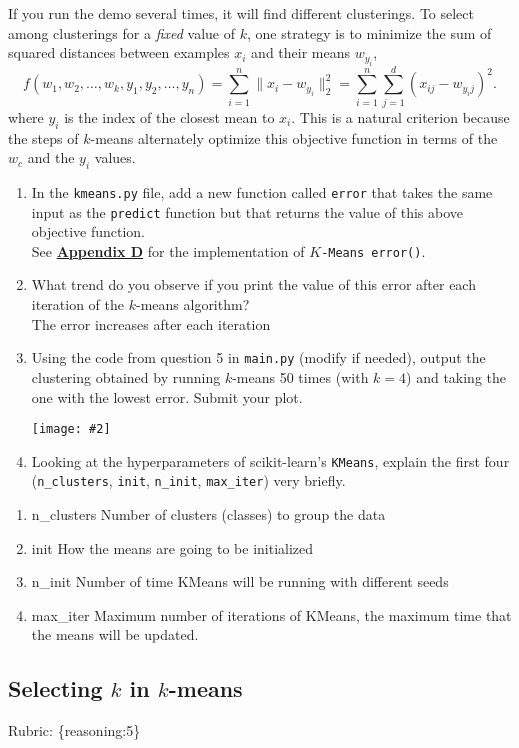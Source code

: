\documentclass{article}
\def\rubric#1{\gre{Rubric: \{#1\}}}{}
\def\blu#1{{\color{blu}#1}}
\def\gre#1{{\color{gre}#1}}
\def\ans#1{{\color{ans}#1}}
\def\norm#1{\|#1\|}
\newcommand{\centerfig}[2]{\begin{center}\texttt{[image: \#2]}\end{center}}
\def\enum#1{\begin{enumerate}#1\end{enumerate}}
\begin{document}
If you run the demo several times, it will find different clusterings. To select among clusterings for a \emph{fixed} value of $k$, one strategy is to minimize the sum of squared distances between examples $x_i$ and their means $w_{y_i}$,
\[
f(w_1,w_2,\dots,w_k,y_1,y_2,\dots,y_n) = \sum_{i=1}^n \norm{x_i - w_{y_i}}_2^2 = \sum_{i=1}^n \sum_{j=1}^d (x_{ij} - w_{y_ij})^2.
\]
 where $y_i$ is the index of the closest mean to $x_i$. This is a natural criterion because the steps of $k$-means alternately optimize this objective function in terms of the $w_c$ and the $y_i$ values.

 \blu{\enum{
 \item In the \texttt{kmeans.py} file, add a new function called \texttt{error} that takes the same input as the \texttt{predict} function but that returns the value of this above objective function. \\
   \ans{
      See \hyperref[appendix:k-Means]{\textbf{Appendix D}} for the implementation of \texttt{$K$-Means error()}.\\
   }
 \item What trend do you observe if you print the value of this error after each iteration of the $k$-means algorithm? \\ 
   \ans{
      The error increases after each iteration
   }
 \item Using the code from question 5 in \texttt{main.py} (modify if needed), output the clustering obtained by running $k$-means 50 times (with $k=4$) and taking the one with the lowest error. Submit your plot. \\
   \ans{
      \centerfig{1}{../figs/q_5_1_kmeans.pdf}
   }
 \item Looking at the hyperparameters of scikit-learn's \texttt{KMeans}, explain the first four (\texttt{n\_clusters}, \texttt{init}, \texttt{n\_init}, \texttt{max\_iter}) very briefly.
 }} 
 \ans{
    \begin{enumerate}
      \item n\_clusters\: Number of clusters (classes) to group the data
      \item init\: How the means are going to be initialized
      \item n\_init\: Number of time KMeans will be running with different seeds
      \item max\_iter\: Maximum number of iterations of KMeans, the maximum time that the means will be updated.
    \end{enumerate}
 }
 \subsection{Selecting $k$ in $k$-means}
\rubric{reasoning:5}
\end{document}
